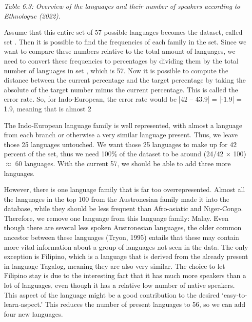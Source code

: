 {\it \footnotesize Table 6.3: Overview of the languages and their number of speakers according to Ethnologue (2022).}
\vspace{0.3cm}


\noindent Assume that this entire set of 57 possible languages becomes the dataset, called set \alpha. Then it is possible to find the frequencies of each family in the \alpha set. Since we want to compare these numbers relative to the total amount of languages, we need to convert these frequencies to percentages by dividing them by the total number of languages in set \alpha, which is 57. Now it is possible to compute the distance between the current percentage and the target percentage by taking the absolute of the target number minus the current percentage. This is called the error rate. So, for Indo-European, the error rate would be |42 – 43.9| = |-1.9| = 1.9, meaning that is almost 2%

The Indo-European language family is well represented, with almost a language from each branch or otherwise a very similar language present. Thus, we leave those 25 languages untouched. We want those 25 languages to make up for 42 percent of the set, thus we need 100\% of the dataset to be around (24/42 $\times$ 100) $\approx$ 60 languages. With the current 57, we should be able to add three more languages. 

However, there is one language family that is far too overrepresented. Almost all the languages in the top 100 from the Austronesian family made it into the  database, while they should be less frequent than Afro-asiatic and Niger-Congo. Therefore, we remove one language from this language family: Malay. Even though there are several less spoken Austronesian languages, the older common ancestor between these languages (Tryon, 1995) entails that these may contain more vital information about a group of languages not seen in the data. The only exception is Filipino, which is a language that is derived from the already present in  language Tagalog, meaning they are also very similar. The choice to let Filipino stay is due to the interesting fact that it has much more speakers than a lot of languages, even though it has a relative low number of native speakers. This aspect of the language might be a good contribution to the desired ‘easy-to-learn-aspect.’ This reduces the number of present languages to 56, so we can add four new languages. 

